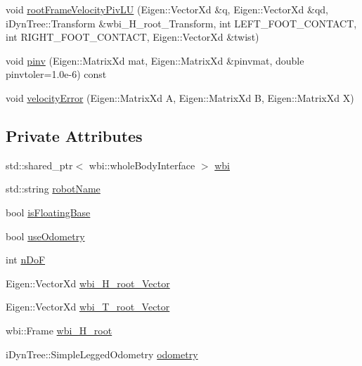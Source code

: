 \begin{DoxyCompactItemize}
\item 
void \hyperlink{classIcubControllerServer_a82650f373c3c2c52a91cc744c67b0dcf}{root\+Frame\+Velocity\+Piv\+LU} (Eigen\+::\+Vector\+Xd \&q, Eigen\+::\+Vector\+Xd \&qd, i\+Dyn\+Tree\+::\+Transform \&wbi\+\_\+\+H\+\_\+root\+\_\+\+Transform, int L\+E\+F\+T\+\_\+\+F\+O\+O\+T\+\_\+\+C\+O\+N\+T\+A\+CT, int R\+I\+G\+H\+T\+\_\+\+F\+O\+O\+T\+\_\+\+C\+O\+N\+T\+A\+CT, Eigen\+::\+Vector\+Xd \&twist)
\item 
void \hyperlink{classIcubControllerServer_af43586b816992e5e7fceac5a7245f673}{pinv} (Eigen\+::\+Matrix\+Xd mat, Eigen\+::\+Matrix\+Xd \&pinvmat, double pinvtoler=1.\+0e-\/6) const
\item 
void \hyperlink{classIcubControllerServer_aaedff28c5d9ac9a7cdbc24c9e0cbc5b3}{velocity\+Error} (Eigen\+::\+Matrix\+Xd A, Eigen\+::\+Matrix\+Xd B, Eigen\+::\+Matrix\+Xd X)
\end{DoxyCompactItemize}
\subsection*{Private Attributes}
\begin{DoxyCompactItemize}
\item 
std\+::shared\+\_\+ptr$<$ wbi\+::whole\+Body\+Interface $>$ \hyperlink{classIcubControllerServer_ae8a89707675adb58bb3006bc085828b7}{wbi}
\item 
std\+::string \hyperlink{classIcubControllerServer_a041d6687258c36677914b1d15f18e153}{robot\+Name}
\item 
bool \hyperlink{classIcubControllerServer_aebc2019921c3eabb53c01012fbd2355a}{is\+Floating\+Base}
\item 
bool \hyperlink{classIcubControllerServer_adc410f503b14ed288c01e877ac405114}{use\+Odometry}
\item 
int \hyperlink{classIcubControllerServer_ab5fb1f18775cfe3036894c73dc21ebcf}{n\+DoF}
\item 
Eigen\+::\+Vector\+Xd \hyperlink{classIcubControllerServer_a42f6a8db660da9dbafbc57941b1ee12f}{wbi\+\_\+\+H\+\_\+root\+\_\+\+Vector}
\item 
Eigen\+::\+Vector\+Xd \hyperlink{classIcubControllerServer_a818b66e75b7f9457a6a5bcbb3c1306a7}{wbi\+\_\+\+T\+\_\+root\+\_\+\+Vector}
\item 
wbi\+::\+Frame \hyperlink{classIcubControllerServer_afd983b69c043eedf958e53582b22195a}{wbi\+\_\+\+H\+\_\+root}
\item 
i\+Dyn\+Tree\+::\+Simple\+Legged\+Odometry \hyperlink{classIcubControllerServer_ad0484106ab9d7fd42e2bd682338871c7}{odometry}
\end{DoxyCompactItemize}
